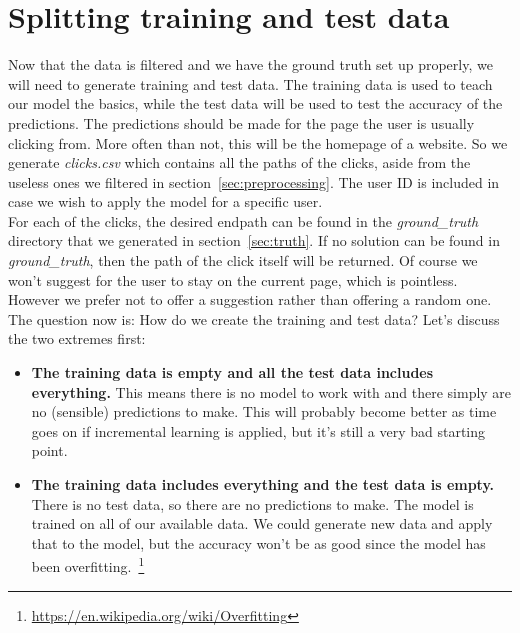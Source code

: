 \section{Splitting training and test data}\label{sec:training}

Now that the data is filtered and we have the ground truth set up properly, we will need to generate training and test data. The training data is used to teach our model the basics, while the test data will be used to test the accuracy of the predictions. The predictions should be made for the page the user is usually clicking from. More often than not, this will be the homepage of a website. So we generate \textit{clicks.csv} which contains all the paths of the clicks, aside from the useless ones we filtered in section~\ref{sec:preprocessing}. The user ID is included in case we wish to apply the model for a specific user.
\\[2ex]
For each of the clicks, the desired endpath can be found in the \textit{ground\_truth} directory that we generated in section~\ref{sec:truth}. If no solution can be found in \textit{ground\_truth}, then the path of the click itself will be returned. Of course we won't suggest for the user to stay on the current page, which is pointless. However we prefer not to offer a suggestion rather than offering a random one.
\\[2ex]
The question now is: How do we create the training and test data? Let's discuss the two extremes first:
\begin{itemize}
	\item \textbf{The training data is empty and all the test data includes everything.} This means there is no model to work with and there simply are no (sensible) predictions to make. This will probably become better as time goes on if incremental learning is applied, but it's still a very bad starting point.
	\item \textbf{The training data includes everything and the test data is empty.} There is no test data, so there are no predictions to make. The model is trained on all of our available data. We could generate new data and apply that to the model, but the accuracy won't be as good since the model has been overfitting.~\footnote{\url{https://en.wikipedia.org/wiki/Overfitting}}
\end{itemize}
